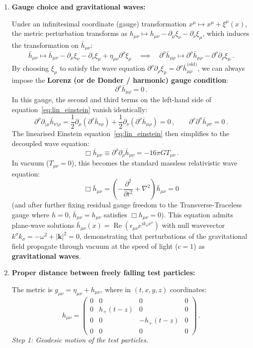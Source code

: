 \documentclass[12pt]{article}
\newcommand{\be}{\begin{equation}}
\newcommand{\ee}{\end{equation}}
\newcommand{\bh}{\bar{h}}
\begin{document}
\begin{enumerate}[label=\alph*)]
\item \textbf{Gauge choice and gravitational waves:}

Under an infinitesimal coordinate (gauge) transformation $x^\mu \mapsto x^\mu + \xi^\mu(x)$, the metric perturbation transforms as $h_{\mu\nu} \mapsto h_{\mu\nu} - \partial_\mu \xi_\nu - \partial_\nu \xi_\mu$, which induces the transformation on $\bh_{\mu\nu}$:
\be
\bh_{\mu\nu} \mapsto \bh_{\mu\nu} - \partial_\mu \xi_\nu - \partial_\nu \xi_\mu + \eta_{\mu\nu} \partial^\rho \xi_\rho \quad \implies \quad \partial^\rho \bh_{\mu\rho} \mapsto \partial^\rho \bh_{\mu\rho} - \partial^\rho \partial_\rho \xi_\mu \,.
\ee
By choosing $\xi_\mu$ to satisfy the wave equation $\partial^\rho\partial_\rho \xi_\mu = \partial^\rho \bh_{\mu\rho}^{\text{(old)}}$, we can always impose the \textbf{Lorenz (or de Donder / harmonic) gauge condition}:
\be
\partial^\rho \bh_{\mu\rho} = 0 \,.
\ee
In this gauge, the second and third terms on the left-hand side of equation~\eqref{eq:lin_einstein} vanish identically:
\be
\partial^\rho \partial_{(\mu} \bh_{\nu)\rho} = \frac{1}{2} \partial_\mu \left(\partial^\rho \bh_{\nu\rho}\right) + \frac{1}{2} \partial_\nu \left(\partial^\rho \bh_{\mu\rho}\right) = 0 \,, \qquad \partial^\rho \partial^\sigma \bh_{\rho\sigma} = 0 \,.
\ee
The linearised Einstein equation~\eqref{eq:lin_einstein} then simplifies to the decoupled wave equation:
\be
\Box \bh_{\mu\nu} \equiv \partial^\rho \partial_\rho \bh_{\mu\nu} = -16\pi G T_{\mu\nu} \,.
\ee
In vacuum ($T_{\mu\nu} = 0$), this becomes the standard massless relativistic wave equation:
\be
\Box \bh_{\mu\nu} = \left( -\frac{\partial^2}{\partial t^2} + \nabla^2 \right) \bh_{\mu\nu} = 0
\ee
(and after further fixing residual gauge freedom to the Transverse-Traceless gauge where $h = 0$, $\bh_{\mu\nu} = h_{\mu\nu}$ satisfies $\Box h_{\mu\nu} = 0$). This equation admits plane-wave solutions $\bh_{\mu\nu}(x) = \operatorname{Re}\left(\epsilon_{\mu\nu} e^{i k_\sigma x^\sigma}\right)$ with null wavevector $k^\sigma k_\sigma = -\omega^2 + |\mathbf{k}|^2 = 0$, demonstrating that perturbations of the gravitational field propagate through vacuum at the speed of light ($c = 1$) as \textbf{gravitational waves}.

\item \textbf{Proper distance between freely falling test particles:}

The metric is $g_{\mu\nu} = \eta_{\mu\nu} + h_{\mu\nu}$, where in $(t,x,y,z)$ coordinates:
\be
h_{\mu\nu} = \begin{pmatrix}
0 & 0 & 0 & 0 \\
0 & h_{+}(t-z) & 0 & 0 \\
0 & 0 & - h_{+}(t-z) & 0 \\
0 & 0 & 0 & 0
\end{pmatrix} \,.
\ee
\emph{Step 1: Geodesic motion of the test particles.}


\end{enumerate}
\end{document}
